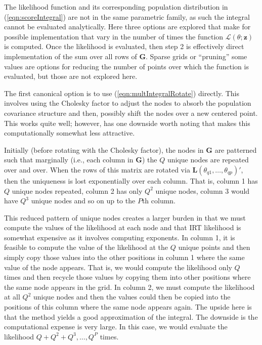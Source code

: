 \documentclass[12pt]{article}
\begin{document}
The likelihood function and its corresponding population distribution in (\ref{eqn:scoreIntegral}) are not in the same parametric family, as such the integral cannot be evaluated analytically. Here three options are explored that make for possible implementation that vary in the number of times the function $\mathcal{L}(\theta;\bm{z})$ is computed. Once the likelihood is evaluated, then step 2 is effectively direct implementation of the sum over all rows of $\bm{G}$. Sparse grids or ``pruning'' some values are options for reducing the number of points over which the function is evaluated, but those are not explored here.

The first canonical option is to use (\ref{eqn:multIntegralRotate}) directly. This involves using the Cholesky factor to adjust the nodes to absorb the population covariance structure and then, possibly shift the nodes over a new centered point. This works quite well; however, has one downside worth noting that makes this computationally somewhat less attractive. 

Initially (before rotating with the Cholesky factor), the nodes in $\bm{G}$ are patterned such that marginally (i.e., each column in $\bm{G}$) the $Q$ unique nodes are repeated over and over. When the rows of this matrix are rotated via $\bm{L}(\theta_{q1}, \ldots, \theta_{qp})'$, then the uniqueness is lost exponentially over each column. That is, column 1 has $Q$ unique nodes repeated, column 2 has only $Q^2$ unique nodes, column 3 would have $Q^3$ unique nodes and so on up to the $P$th column. 

This reduced pattern of unique nodes creates a larger burden in that we must compute the values of the likelihood at each node and that IRT likelihood is somewhat expensive as it involves computing exponents. In column 1, it is feasible to compute the value of the likelihood at the $Q$ unique points and then simply copy those values into the other positions in column 1 where the same value of the node appears. That is, we would compute the likelihood only $Q$ times and then recycle those values by copying them into other positions where the same node appears in the grid. In column 2, we must compute the likelihood at all $Q^2$ unique nodes and then the values could then be copied into the positions of this column where the same node appears again. The upside here is that the method yields a good approximation of the integral. The downside is the computational expense is very large. In this case, we would evaluate the likelihood  $Q + Q^2 + Q^3, \ldots, Q^P$ times.
\end{document}
